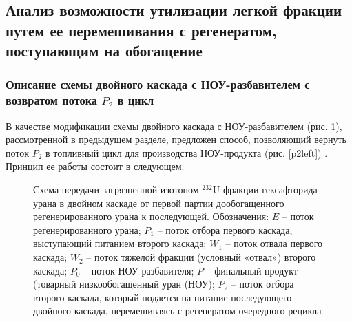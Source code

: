 \subsection{Анализ возможности утилизации легкой фракции путем ее перемешивания с регенератом, поступающим на обогащение}

\subsubsection{Описание схемы двойного каскада с НОУ-разбавителем с возвратом потока $P_2$ в цикл}

В качестве модификации схемы двойного каскада с НОУ-разбавителем (рис. \ref{P2utilizationRing}), рассмотренной в предыдущем разделе, предложен способ, позволяющий вернуть поток $P_2$ в топливный цикл для производства НОУ-продукта (рис. \ref{p2left}) \cite{nevinicaToplivnyyCiklLegkovodnogo2019, nevinicaSposobIzotopnogoVosstanovleniya2019}. Принцип ее работы состоит в следующем.

\begin{figure}[ht]
    \caption{Схема передачи загрязненной изотопом $^{232}$U фракции гексафторида урана в двойном каскаде от первой партии дообогащенного регенерированного урана к последующей. Обозначения: $E$ -- поток регенерированного урана; $P_1$ -- поток отбора первого каскада, выступающий питанием второго каскада; $W_1$ -- поток отвала первого каскада; $W_2$ -- поток тяжелой фракции (условный «отвал») второго каскада; $P_0$ -- поток НОУ-разбавителя; $P$ -- финальный продукт (товарный низкообогащенный уран (НОУ); $P_2$ -- поток отбора второго каскада, который подается на питание последующего двойного каскада, перемешиваясь с регенератом очередного рецикла}\label{P2utilizationRing}
\end{figure}


